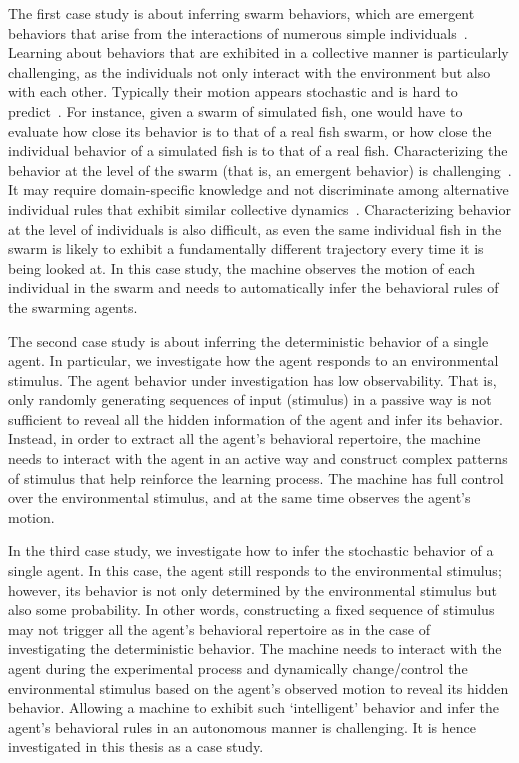 The first case study is about inferring swarm behaviors, which are emergent behaviors that arise from the interactions of numerous simple individuals~\cite{Camazine2001}. Learning about behaviors that are exhibited in a collective manner is particularly challenging, as the individuals not only interact with the environment but also with each other. Typically their motion appears stochastic and is hard to predict~\cite{Dirk2011}. For instance, given a swarm of simulated fish, one would have to evaluate how close its behavior is to that of a real fish swarm, or how close the individual behavior of a simulated fish is to that of a real fish. Characterizing the behavior at the level of the swarm (that is, an emergent behavior) is challenging~\cite{Harvey:SI:2015}. It may require domain-specific knowledge and not discriminate among alternative individual rules that exhibit similar collective dynamics~\cite{Weitz2012}. Characterizing behavior at the level of individuals is also difficult, as even the same individual fish in the swarm is likely to exhibit a fundamentally different trajectory every time it is being looked at. In this case study, the machine observes the motion of each individual in the swarm and needs to automatically infer the behavioral rules of the swarming agents.

The second case study is about inferring the deterministic behavior of a single agent. In particular, we investigate how the agent responds to an environmental stimulus. The agent behavior under investigation has low observability. That is, only randomly generating sequences of input (stimulus) in a passive way is not sufficient to reveal all the hidden information of the agent and infer its behavior. Instead, in order to extract all the agent's behavioral repertoire, the machine needs to interact with the agent in an active way and construct complex patterns of stimulus that help reinforce the learning process. The machine has full control over the environmental stimulus, and at the same time observes the agent's motion. 

In the third case study, we investigate how to infer the stochastic behavior of a single agent. In this case, the agent still responds to the environmental stimulus; however, its behavior is not only determined by the environmental stimulus but also some probability. In other words, constructing a fixed sequence of stimulus may not trigger all the agent's behavioral repertoire as in the case of investigating the deterministic behavior. The machine needs to interact with the agent during the experimental process and dynamically change/control the environmental stimulus based on the agent's observed motion to reveal its hidden behavior. Allowing a machine to exhibit such `intelligent' behavior and infer the agent's behavioral rules in an autonomous manner is challenging. It is hence investigated in this thesis as a case study.  

